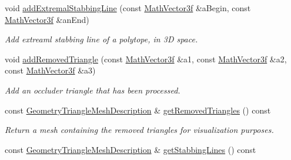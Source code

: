 \begin{DoxyCompactItemize}
\mbox{\label{classvisilib_1_1_helper_visual_debugger_accd7a72ba6f9efc0078f22ec9eb53312}} 
void \mbox{\hyperlink{classvisilib_1_1_helper_visual_debugger_accd7a72ba6f9efc0078f22ec9eb53312}{add\+Extremal\+Stabbing\+Line}} (const \mbox{\hyperlink{classvisilib_1_1_math_vector3__}{Math\+Vector3f}} \&a\+Begin, const \mbox{\hyperlink{classvisilib_1_1_math_vector3__}{Math\+Vector3f}} \&an\+End)
\begin{DoxyCompactList}\small\item\em Add extreaml stabbing line of a polytope, in 3D space. \end{DoxyCompactList}\item 
\mbox{\label{classvisilib_1_1_helper_visual_debugger_a69bc1d302d408341e1443acd0655f939}} 
void \mbox{\hyperlink{classvisilib_1_1_helper_visual_debugger_a69bc1d302d408341e1443acd0655f939}{add\+Removed\+Triangle}} (const \mbox{\hyperlink{classvisilib_1_1_math_vector3__}{Math\+Vector3f}} \&a1, const \mbox{\hyperlink{classvisilib_1_1_math_vector3__}{Math\+Vector3f}} \&a2, const \mbox{\hyperlink{classvisilib_1_1_math_vector3__}{Math\+Vector3f}} \&a3)
\begin{DoxyCompactList}\small\item\em Add an occluder triangle that has been processed. \end{DoxyCompactList}\item 
\mbox{\label{classvisilib_1_1_helper_visual_debugger_a93e8bb815b4b7cc2e6816c26664d431a}} 
const \mbox{\hyperlink{structvisilib_1_1_geometry_triangle_mesh_description}{Geometry\+Triangle\+Mesh\+Description}} \& \mbox{\hyperlink{classvisilib_1_1_helper_visual_debugger_a93e8bb815b4b7cc2e6816c26664d431a}{get\+Removed\+Triangles}} () const
\begin{DoxyCompactList}\small\item\em Return a mesh containing the removed triangles for visualization purposes. \end{DoxyCompactList}\item 
\mbox{\label{classvisilib_1_1_helper_visual_debugger_a0c7ea51d50ca6a422326def264f97407}} 
const \mbox{\hyperlink{structvisilib_1_1_geometry_triangle_mesh_description}{Geometry\+Triangle\+Mesh\+Description}} \& \mbox{\hyperlink{classvisilib_1_1_helper_visual_debugger_a0c7ea51d50ca6a422326def264f97407}{get\+Stabbing\+Lines}} () const

\end{DoxyCompactItemize}
